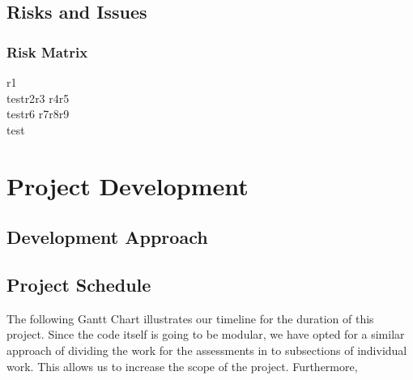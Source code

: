 \documentclass[coverpage,lineno]{../custom}
\begin{document}
\subsection{Risks and Issues}
\label{ssec:risks}

\subsubsection{Risk Matrix}

\RiskMatrix
{r1\\test}{r2}{r3}
{r4}{r5\\test}{r6}
{r7}{r8}{r9\\test}

\section{Project Development}
\label{sec:dev}

\subsection{Development Approach}
\label{ssec:dev_approach}

\subsection{Project Schedule}
\label{ssec:schedule}

The following Gantt Chart illustrates our timeline for the duration of this project. Since the code itself is going to be modular, we have opted for a similar approach of dividing the work for the assessments in to subsections of individual work. This allows us to increase the scope of the project. Furthermore,    
\end{document}
